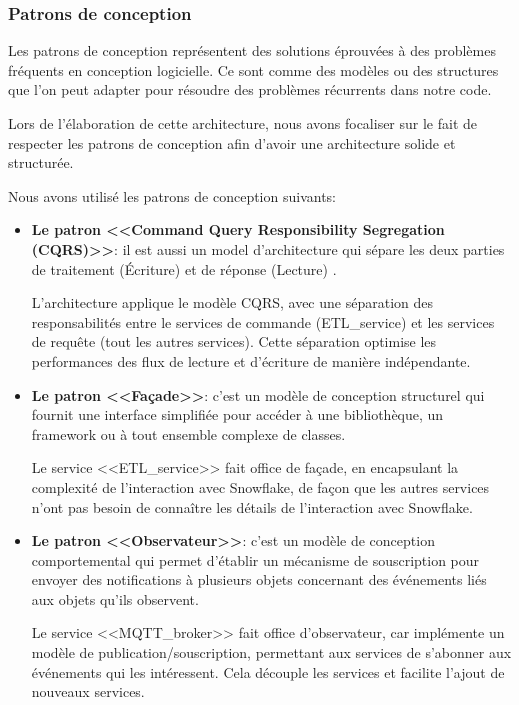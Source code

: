 \subsubsection{Patrons de conception}
\par Les patrons de conception représentent des solutions éprouvées à des problèmes fréquents en conception logicielle. Ce sont comme des modèles ou des structures que l'on peut adapter pour résoudre des problèmes récurrents dans notre code\cite{design_pattern}.
\par Lors de l'élaboration de cette architecture, nous avons focaliser sur le fait de respecter les patrons de conception afin d'avoir une architecture solide et structurée.
\par Nous avons utilisé les patrons de conception suivants:
\begin{itemize}
    \item \textbf{Le patron <<Command Query Responsibility Segregation (CQRS)>>}: il est aussi un model d'architecture qui sépare les deux parties de traitement (Écriture) et de réponse (Lecture) \cite{CQRS}.
    \par L'architecture applique le modèle CQRS, avec une séparation des responsabilités entre le services de commande (ETL\_service) et les services de requête (tout les autres services).
    Cette séparation optimise les performances des flux de lecture et d'écriture de manière indépendante.
    \item \textbf{Le patron <<Façade>>}: c'est un modèle de conception structurel qui fournit une interface simplifiée pour accéder à une bibliothèque, 
    un framework ou à tout ensemble complexe de classes\cite{facade}.
    \par Le service <<ETL\_service>> fait office de façade, en encapsulant la complexité de l'interaction avec Snowflake, 
    de façon que les autres services n'ont pas besoin de connaître les détails de l'interaction avec Snowflake.
    \item \textbf{Le patron <<Observateur>>}: c'est un modèle de conception comportemental qui permet d'établir un mécanisme de souscription pour envoyer des notifications à plusieurs objets concernant des événements liés aux objets qu'ils observent\cite{observer}.
    \par Le service <<MQTT\_broker>> fait office d'observateur, car implémente un modèle de publication/souscription, permettant aux services de s'abonner aux événements qui les intéressent.
    Cela découple les services et facilite l'ajout de nouveaux services.

\end{itemize}

